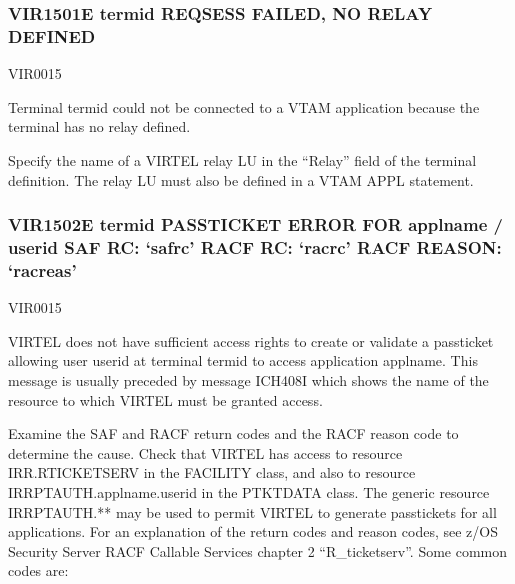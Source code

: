 \documentclass[letterpaper,10pt,english]{sphinxmanual}
\begin{document}
\subsubsection{VIR1501E termid REQSESS FAILED, NO RELAY DEFINED}
\label{\detokenize{messages:vir1501e-termid-reqsess-failed-no-relay-defined}}\begin{description}
\sphinxAtStartPar
VIR0015

\sphinxAtStartPar
Terminal termid could not be connected to a VTAM application because the terminal has no relay defined.

\sphinxAtStartPar
Specify the name of a VIRTEL relay LU in the “Relay” field of the terminal definition. The relay LU must also be defined in a VTAM APPL statement.

\end{description}


\subsubsection{VIR1502E termid PASSTICKET ERROR FOR applname / userid SAF RC: ‘safrc’ RACF RC: ‘racrc’ RACF REASON: ‘racreas’}
\label{\detokenize{messages:vir1502e-termid-passticket-error-for-applname-userid-saf-rc-safrc-racf-rc-racrc-racf-reason-racreas}}\begin{description}
\sphinxAtStartPar
VIR0015

\sphinxAtStartPar
VIRTEL does not have sufficient access rights to create or validate a passticket allowing user userid at terminal termid to access application applname. This message is usually preceded by message ICH408I which shows the name of the resource to which VIRTEL must be granted access.

\sphinxAtStartPar
Examine the SAF and RACF return codes and the RACF reason code to determine the cause. Check that VIRTEL has access to resource IRR.RTICKETSERV in the FACILITY class, and also to resource IRRPTAUTH.applname.userid in the PTKTDATA class. The generic resource IRRPTAUTH.** may be used to permit VIRTEL to generate passtickets for all applications.
For an explanation of the return codes and reason codes, see z/OS Security Server RACF Callable Services chapter 2 “R\_ticketserv”. Some common codes are:

\end{description}
\end{document}
